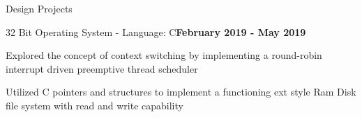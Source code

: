 \documentclass{resume} %
\begin{document}
\begin{rSection}{Design Projects}
\begin{rSubsection}{32 Bit Operating System - Language: C}{\bf February 2019 - May 2019}{}{}
		\item Explored the concept of context switching by implementing a round-robin interrupt driven preemptive thread scheduler
		
		\item Utilized C pointers and structures to implement a functioning ext style Ram Disk file system with read and write capability
		
	\end{rSubsection}





	
	
	
	
	

\end{rSection}
\end{document}
